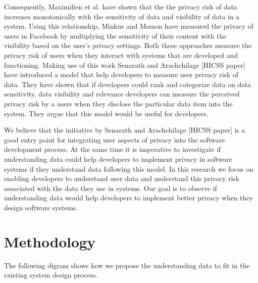 \documentclass{sigchi}
\begin{document}
Consequently, Maximilien et al. \cite {maximilien2009privacy} have shown that the the privacy risk of data increases monotonically with the sensitivity of data and visibility of data in a system. Using this relationship, Minkus and Memon \cite {minkus2014scale} have measured the privacy of users in Facebook by multiplying the sensitivity of their content with the visibility based on the user's privacy settings. Both these approaches measure the privacy risk of users when they interact with systems that are developed and functioning. Making use of this work Senarath and Arachchilage [HICSS paper] have introduced a model that help developers to measure user privacy risk of data. They have shown that if developers could rank and categorize data on data sensitivity, data visibility and relevance developers can measure the perceived privacy risk by a users when they disclose the particular data item into the system. They argue that this model would be useful for developers.

We believe that the initiative by Senarath and Arachchilage [HICSS paper] is a good entry point for integrating user aspects of privacy into the software development process. At the same time it is imperative to investigate if understanding data could help developers to implement privacy in software systems if they understand data following this model. In this research we focus on enabling developers to understand user data and understand this privacy risk associated with the data they use in systems. Our goal is to observe if understanding data would help developers to implement better privacy when they design software systems. 


\section{Methodology}

 The following digram shows how we propose the understanding data to fit in the existing system design process.

\end{document}
